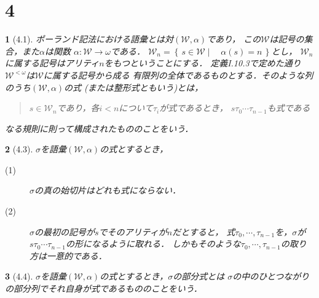 \documentclass[a4j,10.5pt,oneside,openany]{jsbook}
\theoremstyle{mystyle}
\newtheorem{thm}{\color{DarkMidnightBlue}{定理}}[section]
\newtheorem{dfn}[thm]{\color{PakistanGreen}{定義}}
\newcommand{\Set}[2]{\left\{\, #1 \mid \quad #2\, \right\}} %
\begin{document}
\section{4}
	\begin{screen}
		\begin{dfn}[4.1]
			ポーランド記法における語彙とは対$(\mathcal{W},\alpha)$であり，
			この$\mathcal{W}$は記号の集合，また$\alpha$は関数
			$\alpha:\mathcal{W} \rightarrow \omega$である．
			$\mathcal{W}_{n} = \Set{s \in \mathcal{W}}{\alpha(s) = n}$とし，
			$\mathcal{W}_{n}$に属する記号はアリティ$n$をもつということにする．
			定義I.10.3で定めた通り$\mathcal{W}^{<\omega}$は$\mathcal{W}$に属する記号から成る
			有限列の全体であるものとする．そのような列のうち$(\mathcal{W},\alpha)$の式
			(または整形式ともいう)とは，
			\begin{center}
				\begin{quote}
					$s \in \mathcal{W}_{n}$であり，各$i < n$について$\tau_{i}$が式であるとき，
					$s\tau_{0}\cdots\tau_{n-1}$も式である
				\end{quote}
			\end{center}
			なる規則に則って構成されたもののことをいう．
		\end{dfn}
	\end{screen}
	
	\begin{screen}
		\begin{thm}[4.3]
			$\sigma$を語彙$(\mathcal{W},\alpha)$の式とするとき，
			\begin{description}
				\item[(1)] $\sigma$の真の始切片はどれも式にならない．
				\item[(2)] $\sigma$の最初の記号が$s$でそのアリティが$n$だとすると，
					式$\tau_{0},\cdots,\tau_{n-1}$を，$\sigma$が
					$s\tau_{0}\cdots\tau_{n-1}$の形になるように取れる．
					しかもそのような$\tau_{0},\cdots,\tau_{n-1}$の取り方は一意的である．
			\end{description}
		\end{thm}
	\end{screen}
	
	\begin{screen}
		\begin{dfn}[4.4]
			$\sigma$を語彙$(\mathcal{W},\alpha)$の式とするとき，$\sigma$の部分式とは
			$\sigma$の中のひとつながりの部分列でそれ自身が式であるもののことをいう．
		\end{dfn}
	\end{screen}
	
\end{document}
